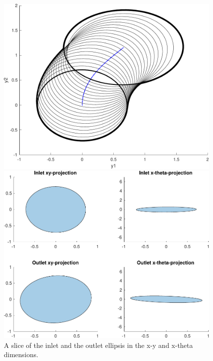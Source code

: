 \begin{figure}[!t]
  \centering
  \begin{minipage}{0.5\columnwidth}
    \includegraphics[width=.8\linewidth]{figures/experiments/sos-calculation}
  \end{minipage}%
  \begin{minipage}{0.5\columnwidth}
    \includegraphics[width=.8\linewidth]{figures/experiments/sos-calculation-inlet-outlet}
  \end{minipage}
  \caption[A slice of the inlet and the outlet ellipsis]{A slice of the inlet and the outlet ellipsis in the x-y and
    x-theta dimensions.}
  \label{fig:funnel-conv}
\end{figure}

